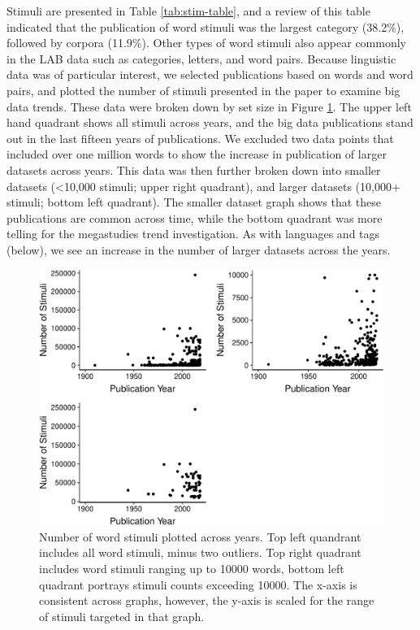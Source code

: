 \documentclass[english,,man]{apa6}
\theoremstyle{definition}
\theoremstyle{definition}
\theoremstyle{definition}
\theoremstyle{remark}
\begin{document}
Stimuli are presented in Table \ref{tab:stim-table}, and a review of
this table indicated that the publication of word stimuli was the
largest category (38.2\%), followed by corpora (11.9\%). Other types of
word stimuli also appear commonly in the LAB data such as categories,
letters, and word pairs. Because linguistic data was of particular
interest, we selected publications based on words and word pairs, and
plotted the number of stimuli presented in the paper to examine big data
trends. These data were broken down by set size in Figure
\ref{fig:word-fig}. The upper left hand quadrant shows all stimuli
across years, and the big data publications stand out in the last
fifteen years of publications. We excluded two data points that included
over one million words to show the increase in publication of larger
datasets across years. This data was then further broken down into
smaller datasets (\textless{}10,000 stimuli; upper right quadrant), and
larger datasets (10,000+ stimuli; bottom left quadrant). The smaller
dataset graph shows that these publications are common across time,
while the bottom quadrant was more telling for the megastudies trend
investigation. As with languages and tags (below), we see an increase in
the number of larger datasets across the years.

\begin{figure}
\centering
\includegraphics{LAB_files/figure-latex/word-fig-1.pdf}
\caption{\label{fig:word-fig}Number of word stimuli plotted across years.
Top left quandrant includes all word stimuli, minus two outliers. Top
right quadrant includes word stimuli ranging up to 10000 words, bottom
left quadrant portrays stimuli counts exceeding 10000. The x-axis is
consistent across graphs, however, the y-axis is scaled for the range of
stimuli targeted in that graph.}
\end{figure}
\end{document}
